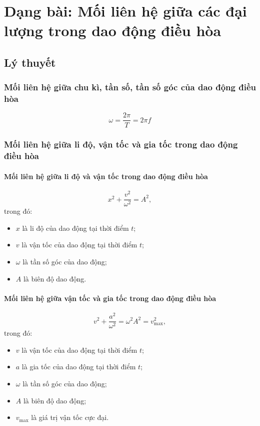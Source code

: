 
\chapter[Dạng bài: Mối liên hệ giữa các đại lượng trong dao động điều hòa]{Dạng bài: Mối liên hệ giữa các đại lượng trong dao động điều hòa}
\section{Lý thuyết}
\subsection{Mối liên hệ giữa chu kì, tần số, tần số góc của dao động điều hòa}
\begin{equation*}
	\omega=\dfrac{2\pi}{T}=2\pi f
\end{equation*}
\subsection{Mối liên hệ giữa li độ, vận tốc và gia tốc trong dao động điều hòa}
\subsubsection{Mối liên hệ giữa li độ và vận tốc trong dao động điều hòa}
\begin{equation*}
	x^2+\dfrac{v^2}{\omega^2}=A^2,
\end{equation*}
trong đó:
\begin{itemize}
	\item $x$ là li độ của dao động tại thời điểm $t$;
	\item $v$ là vận tốc của dao động tại thời điểm $t$;
	\item $\omega$ là tần số góc của dao động;
	\item $A$ là biên độ dao động.
\end{itemize}
\subsubsection{Mối liên hệ giữa vận tốc và gia tốc trong dao động điều hòa}
\begin{equation*}
	v^2+\dfrac{a^2}{\omega^2}=\omega^2A^2=v^2_\text{max},
\end{equation*}
trong đó:
\begin{itemize}
	\item $v$ là vận tốc của dao động tại thời điểm $t$;
	\item $a$ là gia tốc của dao động tại thời điểm $t$;
	\item $\omega$ là tần số góc của dao động;
	\item $A$ là biên độ dao động;
	\item $v_\text{max}$ là giá trị vận tốc cực đại.
\end{itemize}

